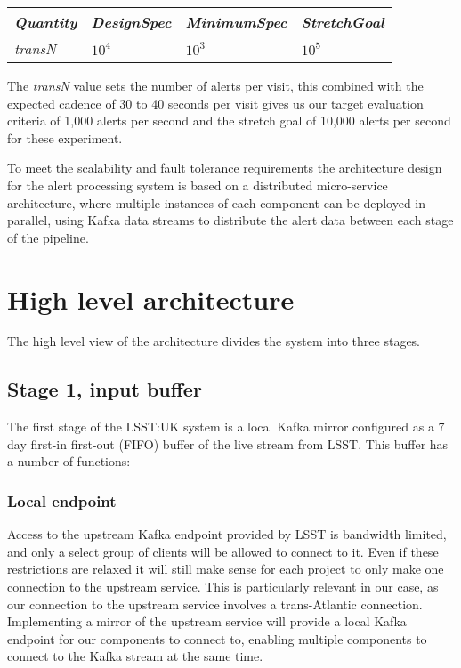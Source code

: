 \documentclass{article}
\newcommand{\kafka} {Kafka\xspace}
\newcommand{\lsst} {LSST\xspace}
\newcommand{\lsstuk} {LSST:UK\xspace}
\begin{document}
\begin{center}
\begin{tabular}{|l|l|l|l|}
\hline
\textit{Quantity} & \textit{DesignSpec} & \textit{MinimumSpec} & \textit{StretchGoal} \\ \hline
\textit{transN}   & $10^{4}$            & $10^{3}$             & $10^{5}$             \\ \hline
\end{tabular}
\end{center}

The \textit{transN} value sets the number of alerts per visit, this combined with the expected cadence of 30 to 40 seconds per visit gives us our target evaluation criteria of 1,000 alerts per second and the stretch goal of 10,000 alerts per second for these experiment.

To meet the scalability and fault tolerance requirements the architecture design for the alert processing system is based on a distributed micro-service architecture, where multiple instances of each component can be deployed in parallel, using Kafka data streams to distribute the alert data between each stage of the pipeline.

\section{High level architecture}
\label{high-level-architecture}

The high level view of the architecture divides the system into three stages.

\subsection{Stage 1, input buffer}
\label{stage-1}

The first stage of the \lsstuk system is a local \kafka mirror configured as a 7 day first-in first-out (FIFO) buffer of the live stream from \lsst. This buffer has a number of functions:

\subsubsection{Local endpoint}
\label{stage-1.local-endpoint}
Access to the upstream \kafka endpoint provided by \lsst is bandwidth limited, and only a select group of clients will be allowed to connect to it. Even if these restrictions are relaxed it will still make sense for each project to only make one connection to the upstream service.
This is particularly relevant in our case, as our connection to the upstream service involves a trans-Atlantic connection.
Implementing a mirror of the upstream service will provide a local \kafka endpoint for our components to connect to, enabling multiple components to connect to the \kafka stream at the same time.
\end{document}
